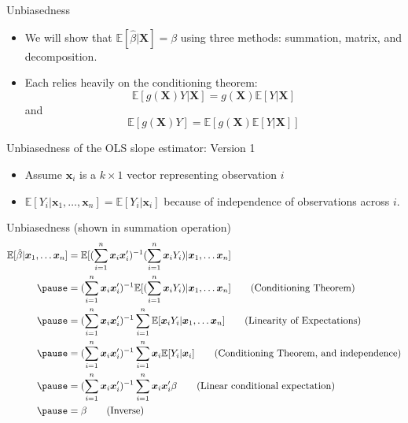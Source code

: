 \documentclass[aspectratio=169, handout]{beamer}
\numberwithin{equation}{section}
\begin{document}
\begin{frame}{Unbiasedness}
\begin{itemize}
\item We will show that $\mathbb{E}[\hat{\beta}|\bm{X}]=\beta$ using three methods: summation, matrix, and decomposition.
\item Each relies heavily on the conditioning theorem:
$$\mathbb{E}[g(\bm{X})Y|\bm{X}]=g(\bm{X})\mathbb{E}[Y|\bm{X}]$$
and
$$\mathbb{E}[g(\bm{X})Y]=\mathbb{E}[g(\bm{X})\mathbb{E}[Y|\bm{X}]]$$

\end{itemize}
\end{frame}

\begin{frame}{Unbiasedness of the OLS slope estimator: Version 1}
\begin{itemize}
\item Assume $\bm{x}_i$ is a $k\times 1$ vector representing observation $i$\\
\item $\mathbb{E}[Y_i|\bm{x}_1,\ldots, \bm{x}_n]=\mathbb{E}[Y_i|\bm{x}_i]$ because of independence of observations across $i$.
\end{itemize}
\end{frame}

\begin{frame}{Unbiasedness (shown in summation operation)}
\small
\begin{align*}
\mathbb{E}[\hat{\beta}|\bm{x}_1,\ldots \bm{x}_n]&=\mathbb{E}[(\sum_{i=1}^n\bm{x}_i\bm{x}_i')^{-1}(\sum_{i=1}^n\bm{x}_iY_i)|\bm{x}_1,\ldots \bm{x}_n]\\\pause
&=(\sum_{i=1}^n\bm{x}_i\bm{x}_i')^{-1}\mathbb{E}[(\sum_{i=1}^n\bm{x}_iY_i)|\bm{x}_1,\ldots \bm{x}_n] \tag{Conditioning Theorem}\\ \pause
&=(\sum_{i=1}^n\bm{x}_i\bm{x}_i')^{-1}\sum_{i=1}^n \mathbb{E}[\bm{x}_iY_i|\bm{x}_1,\ldots \bm{x}_n] \tag{Linearity of Expectations}\\ \pause
&=(\sum_{i=1}^n\bm{x}_i\bm{x}_i')^{-1}\sum_{i=1}^n \bm{x}_i\mathbb{E}[Y_i|\bm{x}_i] \tag{Conditioning Theorem, and independence}\\ \pause
&=(\sum_{i=1}^n\bm{x}_i\bm{x}_i')^{-1}\sum_{i=1}^n \bm{x}_i\bm{x}_i'\beta \tag{Linear conditional expectation}\\ \pause
&=\beta \tag{Inverse}\\
\end{align*}
\end{frame}
\end{document}
